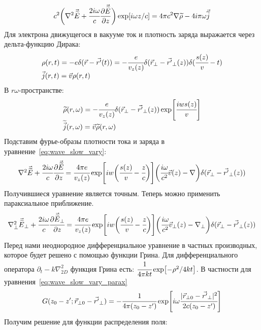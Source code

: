 \begin{equation}
	\label{eq:wave_slow_vary}
	c^2\bigg(\nabla^2 \vec{\widetilde{E}} + \cfrac{2i\omega}{c}\pdv{\vec{\widetilde{E}}}{z}\bigg)\exp[i\omega z/c] = 4\pi c^2 \nabla  \widetilde{\rho} - 4i\pi\omega\vec{\widetilde{j}}
\end{equation}
Для электрона движущегося в вакууме ток и плотность заряда выражается через дельта-функцию Дирака:
\begin{equation}
	\begin{array}{lcl}
		\rho(r,t) = -e\delta(\vec{r}- \vec{r'}(t)) = -\cfrac{e}{v_z(z)}\delta(\vec{r}_{\bot}- \vec{r'}_{\bot}(z))\delta(\cfrac{s(z)}{v} - t)\\
		\vec{j}(r,t) = \vec{v}\rho(r,t)	
	\end{array}
\end{equation} 
В $r\omega$-пространстве: 
\begin{equation}
	\begin{array}{lcl}
		\widetilde{\rho}(r,\omega) = -\cfrac{e}{v_z(z)}\delta(\vec{r}_{\bot}- \vec{r'}_{\bot}(z))\exp[\cfrac{iws(z)}{v}]\\
		\widetilde{\vec{j}}(r,\omega) = \vec{v}\widetilde{\rho}(r,\omega)	
	\end{array}
\end{equation} 
Подставим фурье-образы плотности тока и заряда в уравнение~\ref{eq:wave_slow_vary}:
\begin{equation}
	\label{eq:wave_eq}
	\begin{array}{lcl}
		\nabla^2 \vec{\widetilde{E}} + \cfrac{2i\omega}{c}\cfrac{\partial\vec{\widetilde{E}}}{\partial z} = 
		\cfrac{4\pi e}{v_z(z)} \exp[iw\bigg(\cfrac{s(z)}{v} - \cfrac{z}{c}\bigg)]
		\bigg(  
			\cfrac{i\omega}{c^2}\vec{v}(z)
			-\nabla\bigg) \delta(\vec{r}_{\bot} - \vec{r'}_{\bot}(z)) 
		
	\end{array}
\end{equation} 
Получившиеся уравнение является точным. Теперь можно применить параксиальное приближение. 
\begin{equation}
	\label{eq:wave_slow_vary_parax}
	\begin{array}{lcl}
		\nabla_{\bot}^2 \vec{\widetilde{E}}_{\bot} + \cfrac{2i\omega}{c}\cfrac{\partial\vec{\widetilde{E}}_{\bot}}{\partial z} = 
		\cfrac{4\pi e}{v_z(z)} \exp[iw\bigg(\cfrac{s(z)}{v} - \cfrac{z}{c}\bigg)]\bigg(  
			\cfrac{i\omega}{c^2}\vec{v}_{\bot}(z) 
			-\nabla_{\bot}\bigg) \delta(\vec{r}_{\bot} - \vec{r'}_{\bot}(z)) 
	\end{array}
\end{equation} 
Перед нами неоднородное дифференциальное уравнение в частных производных, которое будет решено с помощью функции Грина. Для дифференциального оператора $\partial_t - k\nabla_{2D}^2$ функция Грина есть: $\cfrac{1}{4\pi kt}\exp[-\rho^2/4kt]$. В частности для уравнения~\ref{eq:wave_slow_vary_parax}
\begin{equation}
	\label{eq:Green_func}
	G(z_0 - z'; \vec{r}_{\bot 0} - \vec{r'}_{\bot}) = 
	- \cfrac{1}{4\pi (z_0 - z')}\exp[i\omega \cfrac{|\vec{r}_{\bot 0} - \vec{r'}_{\bot}|^2}{2c(z_0 - z')}]
\end{equation} 
Получим решение для функции распределения поля:

